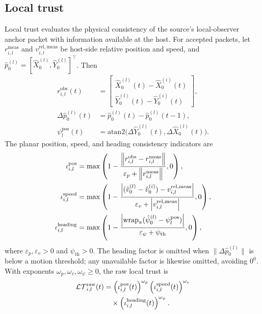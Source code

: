 \documentclass[letterpaper,journal]{IEEEtran}
\def\LT{\mathcal{LT}} %
\begin{document}
\subsection{Local trust}\label{sub:local_trust}
Local trust evaluates the physical consistency of the source's local-observer anchor packet with information available at the host. For accepted packets, let $r_{i,l}^{\mathrm{meas}}$ and $v_{i,l}^{\mathrm{rel,meas}}$ be host-side relative position and speed, and $\hat p_0^{(l)}=[\hat X_0^{(l)},\hat Y_0^{(l)}]^\top$. Then
\begin{align*}
    r_{i,l}^{\mathrm{obs}}(t)
    &=
    \begin{bmatrix}
    \hat X_0^{(l)}(t)-\hat X_0^{(i)}(t)\\
    \hat Y_0^{(l)}(t)-\hat Y_0^{(i)}(t)
    \end{bmatrix},\\
    \Delta\hat p_0^{(l)}(t)&=\hat p_0^{(l)}(t)-\hat p_0^{(l)}(t-1),\\
    \psi_{l}^{\mathrm{pos}}(t)&=
    \mathrm{atan2}\big(\Delta\hat Y_0^{(l)}(t),\Delta\hat X_0^{(l)}(t)\big).
\end{align*}
The planar position, speed, and heading consistency indicators are
\begin{align}
    \iota_{i,l}^{\mathrm{pos}}
    &=
    \max\left(
    1-
    \frac{\left\|r_{i,l}^{\mathrm{obs}}-r_{i,l}^{\mathrm{meas}}\right\|}
    {\varepsilon_p+\left\|r_{i,l}^{\mathrm{meas}}\right\|},0
    \right), \notag\\
    \iota_{i,l}^{\mathrm{speed}}
    &=
    \max\left(
    1-
    \frac{\left|(\hat v_{0}^{(l)}-\hat v_{0}^{(i)})-v_{i,l}^{\mathrm{rel,meas}}\right|}
    {\varepsilon_v+\left|v_{i,l}^{\mathrm{rel,meas}}\right|},0
    \right), \notag\\
    \iota_{i,l}^{\mathrm{heading}}
    &=
    \max\left(
    1-
    \frac{\left|\mathrm{wrap}_{\pi}(\hat\psi_0^{(l)}-\psi_l^{\mathrm{pos}})\right|}
    {\varepsilon_{\psi}+\psi_{\mathrm{th}}},0
    \right),
    \label{eq_local_consistency_indicators}
\end{align}
where $\varepsilon_p,\varepsilon_v>0$ and $\psi_{\mathrm{th}}>0$. The heading factor is omitted when $\|\Delta\hat p_0^{(l)}\|$ is below a motion threshold; any unavailable factor is likewise omitted, avoiding $0^0$. With exponents $\omega_p,\omega_v,\omega_\psi\ge0$, the raw local trust is
\begin{align}
    \LT_{i,l}^{\mathrm{raw}}(t)
    &=
    \left(\iota_{i,l}^{\mathrm{pos}}(t)\right)^{\omega_p}
    \left(\iota_{i,l}^{\mathrm{speed}}(t)\right)^{\omega_v}
    \notag\\
    &\quad\times
    \left(\iota_{i,l}^{\mathrm{heading}}(t)\right)^{\omega_\psi}.
    \label{eq_local_trust_product}
\end{align}
\end{document}
